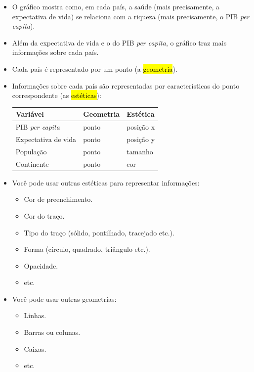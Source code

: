 \documentclass[
  11pt]{report}
\providecommand{\tightlist}{%
  \setlength{\itemsep}{0pt}\setlength{\parskip}{0pt}}
\begin{document}
\begin{itemize}
\item
  O gráfico mostra como, em cada país, a saúde (mais precisamente, a expectativa de vida) se relaciona com a riqueza (mais precisamente, o PIB \emph{per capita}).
\item
  Além da expectativa de vida e o do PIB \emph{per capita}, o gráfico traz mais informações sobre cada país.
\item
  Cada país é representado por um ponto (a {\hl{geometria}}).
\item
  Informações sobre cada país são representadas por características do ponto correspondente (as {\hl{estéticas}}):

  \begin{longtable}[]{@{}lll@{}}
  \toprule
  Variável & Geometria & Estética \\
  \midrule
  \endhead
  PIB \emph{per capita} & ponto & posição x \\
  Expectativa de vida & ponto & posição y \\
  População & ponto & tamanho \\
  Continente & ponto & cor \\
  \bottomrule
  \end{longtable}
\item
  Você pode usar outras estéticas para representar informações:

  \begin{itemize}
  \tightlist
  \item
    Cor de preenchimento.
  \item
    Cor do traço.
  \item
    Tipo do traço (sólido, pontilhado, tracejado etc.).
  \item
    Forma (círculo, quadrado, triângulo etc.).
  \item
    Opacidade.
  \item
    etc.
  \end{itemize}
\item
  Você pode usar outras geometrias:

  \begin{itemize}
  \tightlist
  \item
    Linhas.
  \item
    Barras ou colunas.
  \item
    Caixas.
  \item
    etc.
  \end{itemize}
\end{itemize}
\end{document}
